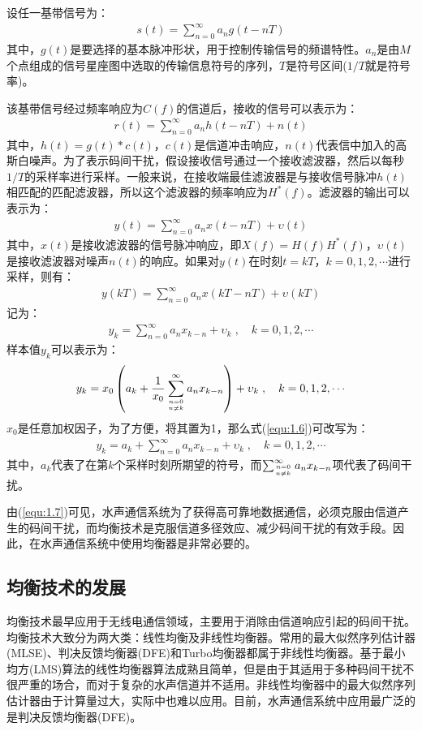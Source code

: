 设任一基带信号为：
\begin{eqnarray}
    s(t)=\sum_{n=0}^{\infty}a_ng(t-nT)
    \label{equ:1.1}
\end{eqnarray}
其中，$g(t)$是要选择的基本脉冲形状，用于控制传输信号的频谱特性。$a_n$是由$M$个点组成的信号星座图中选取的传输信息符号的序列，$T$是符号区间($1/T$就是符号率)。

该基带信号经过频率响应为$C(f)$的信道后，接收的信号可以表示为：
\begin{eqnarray}
    r(t)=\sum_{n=0}^{\infty}a_nh(t-nT)+n(t)
    \label{equ:1.2}
\end{eqnarray}
其中，$h(t)=g(t)*c(t)$，$c(t)$是信道冲击响应，$n(t)$代表信中加入的高斯白噪声。为了表示码间干扰，假设接收信号通过一个接收滤波器，然后以每秒$1/T$的采样率进行采样。一般来说，在接收端最佳滤波器是与接收信号脉冲$h(t)$相匹配的匹配滤波器，所以这个滤波器的频率响应为$H^*(f)$。滤波器的输出可以表示为：
\begin{eqnarray}
    y(t)=\sum_{n=0}^{\infty}a_nx(t-nT)+\upsilon(t)
    \label{equ:1.3}
\end{eqnarray}
其中，$x(t)$是接收滤波器的信号脉冲响应，即$X(f)=H(f)H^*(f)$，$\upsilon(t)$是接收滤波器对噪声$n(t)$的响应。如果对$y(t)$在时刻$t=kT$，$k=0,1,2,\cdots$进行采样，则有：
\begin{eqnarray}
    y(kT)=\sum_{n=0}^{\infty}a_nx(kT-nT)+\upsilon(kT)
    \label{equ:1.4}
\end{eqnarray}
记为：
\begin{eqnarray}
    y_k=\sum_{n=0}^{\infty}a_nx_{k-n}+\upsilon_k\;,\quad k=0,1,2,\cdots
    \label{equ:1.5}
\end{eqnarray}
样本值$y_k$可以表示为：
\begin{eqnarray}
    y_k=x_0\left(a_k+\frac{1}{x_0}\sum_{n=0 \atop n\neq
    k}^{\infty}a_nx_{k-n}\right)+\upsilon_k\;,\quad k=0,1,2,\cdots
    \label{equ:1.6}
\end{eqnarray}
$x_0$是任意加权因子，为了方便，将其置为1，那么式(\ref{equ:1.6})可改写为：
\begin{eqnarray}
    y_k=a_k+\sum_{n=0}^{\infty}a_nx_{k-n}+\upsilon_k\;,\quad k=0,1,2,\cdots
    \label{equ:1.7}
\end{eqnarray}
其中，$a_k$代表了在第$k$个采样时刻所期望的符号，而$\sum_{n=0\atop n\neq k}^{\infty}a_nx_{k-n}$项代表了码间干扰。

由(\ref{equ:1.7})可见，水声通信系统为了获得高可靠地数据通信，必须克服由信道产生的码间干扰，而均衡技术是克服信道多径效应、减少码间干扰的有效手段。因此，在水声通信系统中使用均衡器是非常必要的。
\subsection{均衡技术的发展}
均衡技术最早应用于无线电通信领域，主要用于消除由信道响应引起的码间干扰。均衡技术大致分为两大类：线性均衡及非线性均衡器。常用的最大似然序列估计器(MLSE)、判决反馈均衡器(DFE)和Turbo均衡器都属于非线性均衡器。基于最小均方(LMS)算法的线性均衡器算法成熟且简单，但是由于其适用于多种码间干扰不很严重的场合，而对于复杂的水声信道并不适用。非线性均衡器中的最大似然序列估计器由于计算量过大，实际中也难以应用。目前，水声通信系统中应用最广泛的是判决反馈均衡器(DFE)。

